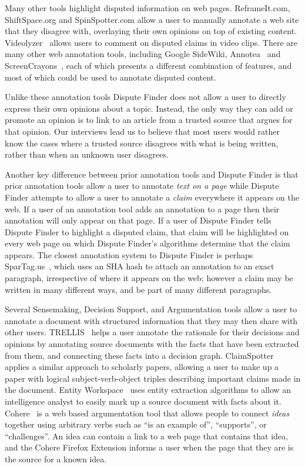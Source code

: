 \documentclass{www2010-submission}
\begin{document}
Many other tools highlight disputed information on web pages. ReframeIt.com, ShiftSpace.org and SpinSpotter.com allow a user to manually annotate a web site that they disagree with, overlaying their own opinions on top of existing content. Videolyzer~\cite{Diakopoulos2008} allows users to comment on disputed claims in video clips. There are many other web annotation tools, including Google SideWiki, Annotea~\cite{Koivunen2001} and ScreenCrayons~\cite{Olsen2004}, each of which presents a different combination of features, and most of which could be used to annotate disputed content.

Unlike these annotation tools Dispute Finder does not allow a user to directly express their own opinions about a topic. Instead, the only way they can add or promote an opinion is to link to an article from a trusted source that argues for that opinion. Our interviews lead us to believe that most users would rather know the cases where a trusted source disagrees with what is being written, rather than when an unknown user disagrees.

Another key difference between prior annotation tools and Dispute Finder is that prior annotation tools allow a user to annotate {\it text on a page} while Dispute Finder attempts to allow a user to annotate a {\it claim} everywhere it appears on the web. If a user of an annotation tool adds an annotation to a page then their annotation will only appear on that page. If a user of Dispute Finder tells Dispute Finder to highlight a disputed claim, that claim will be highlighted on every web page on which Dispute Finder's algorithms determine that the claim appears. The closest annotation system to Dispute Finder is perhaps SparTag.us~\cite{Hong2009}, which uses an SHA hash to attach an annotation to an exact paragraph, irrespective of where it appears on the web; however a claim may be written in many different ways, and be part of many different paragraphs.

Several Sensemaking, Decision Support, and Argumentation tools allow a user to annotate a document with structured information that they may then share with other users. TRELLIS~\cite{Gil2002} helps a user annotate the rationale for their decisions and opinions by annotating source documents with the facts that have been extracted from them, and connecting these facts into a decision graph. ClaimSpotter~\cite{Sereno2005,Sereno2004} applies a similar approach to scholarly papers, allowing a user to make up a paper with logical subject-verb-object triples describing important claims made in the document. Entity Workspace~\cite{Bier2006} uses entity extraction algorithms to allow an intelligence analyst to easily mark up a source document with facts about it. Cohere~\cite{Shum2008} is a web based argumentation tool that allows people to connect {\it ideas} together using arbitrary verbs such as ``is an example of'', ``supports'', or ``challenges''. An idea can contain a link to a web page that contains that idea, and the Cohere Firefox Extension informs a user when the page that they are is the source for a known idea.
\end{document}
